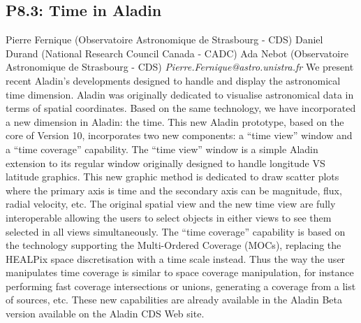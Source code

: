 \documentclass{report}
\begin{document}
\subsection*{P8.3: Time in Aladin}
\bigskip
Pierre Fernique (Observatoire Astronomique de Strasbourg - CDS) \newline Daniel Durand (National Research Council Canada - CADC) \newline  Ada Nebot (Observatoire Astronomique de Strasbourg - CDS)\newline   \newline  \newline  \newline\newline
{\it Pierre.Fernique@astro.unistra.fr}\newline
\newline\newline
We present recent Aladin’s developments designed to handle and display the astronomical time dimension. Aladin was originally dedicated to visualise astronomical data in terms of spatial coordinates. Based on the same technology, we have incorporated a new dimension in Aladin: the time. This new Aladin prototype, based on the core of Version 10, incorporates two new components: a “time view” window and a “time coverage” capability. The “time view” window is a simple Aladin extension to its regular window originally designed to handle longitude VS latitude graphics. This new graphic method is dedicated to draw scatter plots where the primary axis is time and the secondary axis can be magnitude, flux, radial velocity, etc. The original spatial view and the new time view are fully interoperable allowing the users to select objects in either views to see them selected in all views simultaneously. The “time coverage” capability is based on the technology supporting the Multi-Ordered Coverage (MOCs), replacing the HEALPix space discretisation with a time scale instead. Thus the way the user manipulates time coverage is similar to space coverage manipulation, for instance performing fast coverage intersections or unions, generating a coverage from a list of sources, etc. These new capabilities are already available in the Aladin Beta version available on the Aladin CDS Web site.\newline
\newpage
\end{document}
